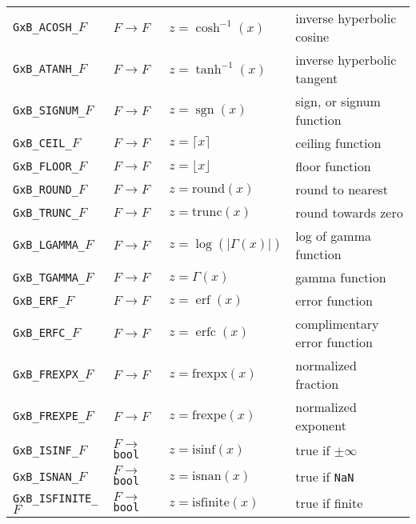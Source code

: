 \documentclass[12pt]{article}
\DeclareMathOperator{\sgn}{sgn}
\DeclareMathOperator{\erf}{erf}
\DeclareMathOperator{\erfc}{erfc}
\begin{document}
{{\begin{tabular}{|llll|}
\verb'GxB_ACOSH_'$F$    & $F \rightarrow F$ & $z = \cosh^{-1}(x)$        & inverse hyperbolic cosine \\
\verb'GxB_ATANH_'$F$    & $F \rightarrow F$ & $z = \tanh^{-1}(x)$        & inverse hyperbolic tangent \\
\hline
\verb'GxB_SIGNUM_'$F$   & $F \rightarrow F$ & $z = \sgn(x)$                 & sign, or signum function \\
\verb'GxB_CEIL_'$F$     & $F \rightarrow F$ & $z = \lceil x \rceil $       & ceiling function \\
\verb'GxB_FLOOR_'$F$    & $F \rightarrow F$ & $z = \lfloor x \rfloor $     & floor function \\
\verb'GxB_ROUND_'$F$    & $F \rightarrow F$ & $z = \mbox{round}(x)$        & round to nearest \\
\verb'GxB_TRUNC_'$F$    & $F \rightarrow F$ & $z = \mbox{trunc}(x)$        & round towards zero \\
\hline
\verb'GxB_LGAMMA_'$F$   & $F \rightarrow F$ & $z = \log(|\Gamma (x)|)$  & log of gamma function \\
\verb'GxB_TGAMMA_'$F$   & $F \rightarrow F$ & $z = \Gamma(x)$        & gamma function \\
\verb'GxB_ERF_'$F$      & $F \rightarrow F$ & $z = \erf(x)$          & error function \\
\verb'GxB_ERFC_'$F$     & $F \rightarrow F$ & $z = \erfc(x)$         & complimentary error function \\
\hline
\verb'GxB_FREXPX_'$F$   & $F \rightarrow F$ & $z = \mbox{frexpx}(x)$  & normalized fraction \\
\verb'GxB_FREXPE_'$F$   & $F \rightarrow F$ & $z = \mbox{frexpe}(x)$  & normalized exponent \\
\hline
\verb'GxB_ISINF_'$F$    & $F \rightarrow $ \verb'bool' & $z = \mbox{isinf}(x)$ & true if $\pm \infty$ \\
\verb'GxB_ISNAN_'$F$    & $F \rightarrow $ \verb'bool' & $z = \mbox{isnan}(x)$ & true if \verb'NaN' \\
\verb'GxB_ISFINITE_'$F$ & $F \rightarrow $ \verb'bool' & $z = \mbox{isfinite}(x)$ & true if finite \\
\hline
\end{tabular}
\vspace{0.2in}

}}
\end{document}
